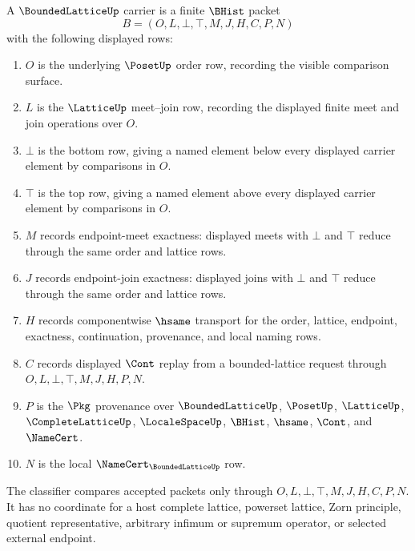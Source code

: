 \begin{definition}
\label{def:bounded-lattice-carrier}
A $\BoundedLatticeUp$ carrier is a finite $\BHist$ packet
$$
B=(O,L,\bot,\top,M,J,H,C,P,N)
$$
with the following displayed rows:
\begin{enumerate}
\item $O$ is the underlying $\PosetUp$ order row, recording the visible comparison surface.
\item $L$ is the $\LatticeUp$ meet--join row, recording the displayed finite meet and join operations over $O$.
\item $\bot$ is the bottom row, giving a named element below every displayed carrier element by comparisons in $O$.
\item $\top$ is the top row, giving a named element above every displayed carrier element by comparisons in $O$.
\item $M$ records endpoint-meet exactness: displayed meets with $\bot$ and $\top$ reduce through the same order and lattice rows.
\item $J$ records endpoint-join exactness: displayed joins with $\bot$ and $\top$ reduce through the same order and lattice rows.
\item $H$ records componentwise $\hsame$ transport for the order, lattice, endpoint, exactness, continuation, provenance, and local naming rows.
\item $C$ records displayed $\Cont$ replay from a bounded-lattice request through $O,L,\bot,\top,M,J,H,P,N$.
\item $P$ is the $\Pkg$ provenance over $\BoundedLatticeUp$, $\PosetUp$, $\LatticeUp$, $\CompleteLatticeUp$, $\LocaleSpaceUp$, $\BHist$, $\hsame$, $\Cont$, and $\NameCert$.
\item $N$ is the local $\NameCert_{\BoundedLatticeUp}$ row.
\end{enumerate}
The classifier compares accepted packets only through $O,L,\bot,\top,M,J,H,C,P,N$. It has no coordinate for a host complete lattice, powerset lattice, Zorn principle, quotient representative, arbitrary infimum or supremum operator, or selected external endpoint.
\end{definition}

